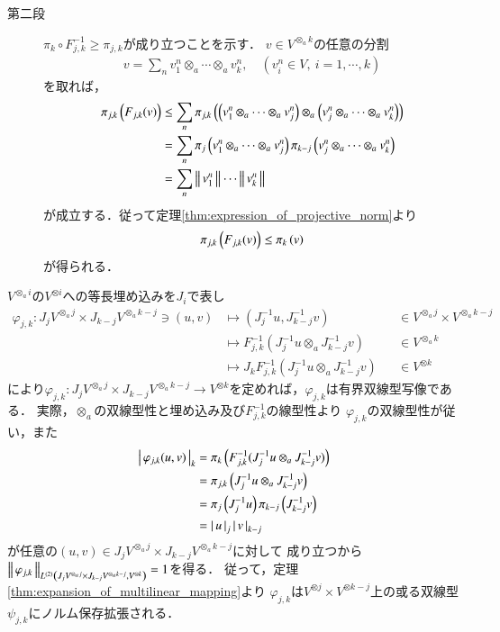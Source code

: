 \begin{prf}
\begin{description}
			\item[第二段]
				$\pi_k \circ F^{-1}_{j,k} \geq \pi_{j,k}$が成り立つことを示す．
				$v \in V^{\otimes_a k}$の任意の分割
				\begin{align}
					v = \sum_n v^n_1 \otimes_a \cdots \otimes_a v^n_k,
					\quad (v^n_i \in V,\ i=1,\cdots,k)
				\end{align}
				を取れば，
				\begin{align}
					\projectivenorm{F_{j,k}(v)}{j,k}
					&\leq \sum_n \projectivenorm{\left( v^n_1 \otimes_a \cdots \otimes_a v^n_j \right) \otimes_a \left( v^n_j \otimes_a \cdots \otimes_a v^n_k \right)}{j,k} \\
					&= \sum_n \projectivenorm{v^n_1 \otimes_a \cdots \otimes_a v^n_j}{j}
						\projectivenorm{v^n_j \otimes_a \cdots \otimes_a v^n_k}{k-j} \\
					&= \sum_n \Norm{v^n_1}{} \cdots \Norm{v^n_k}{}
				\end{align}
				が成立する．従って定理\ref{thm:expression_of_projective_norm}より
				\begin{align}
					\projectivenorm{F_{j,k}(v)}{j,k} \leq \projectivenorm{v}{k}
				\end{align}
				が得られる．
				\QED
		\end{description}
	\end{prf}
	
	
	$V^{\otimes_a i}$の$V^{\otimes i}$への等長埋め込みを$J_i$で表し
	\begin{align}
		\varphi_{j,k}:J_j V^{\otimes_a j} \times J_{k-j} V^{\otimes_a k-j} \ni (u,v)
		& \longmapsto ( J_j^{-1}u,J_{k-j}^{-1}v ) &&\in V^{\otimes_a j} \times V^{\otimes_a k-j} \\
		& \longmapsto F_{j,k}^{-1} (J_j^{-1}u \otimes_a J_{k-j}^{-1}v) &&\in V^{\otimes_a k} \\
		& \longmapsto J_k F_{j,k}^{-1} (J_j^{-1}u \otimes_a J_{k-j}^{-1}v) &&\in V^{\otimes k}
	\end{align}
	により$\varphi_{j,k}:J_j V^{\otimes_a j} \times J_{k-j} V^{\otimes_a k-j}
	\longrightarrow V^{\otimes k}$を定めれば，$\varphi_{j,k}$は有界双線型写像である．
	実際，$\otimes_a$の双線型性と埋め込み及び$F_{j,k}^{-1}$の線型性より
	$\varphi_{j,k}$の双線型性が従い，また
	\begin{align}
		\compcrossnorm{\varphi_{j,k}(u,v)}{k}
		&= \projectivenorm{F_{j,k}^{-1} (J_j^{-1}u \otimes_a J_{k-j}^{-1}v)}{k} \\
		&= \projectivenorm{J_j^{-1}u \otimes_a J_{k-j}^{-1}v}{j,k} \\
		&= \projectivenorm{J_j^{-1}u}{j} \projectivenorm{J_{k-j}^{-1}v}{k-j} \\
		&= \compcrossnorm{u}{j} \compcrossnorm{v}{k-j}
	\end{align}
	が任意の$(u,v) \in J_j V^{\otimes_a j} \times J_{k-j} V^{\otimes_a k-j}$に対して
	成り立つから$\Norm{\varphi_{j,k}}{\ContLn{J_j V^{\otimes_a j} \times J_{k-j} V^{\otimes_a k-j}}{V^{\otimes k}}{2}} = 1$を得る．
	従って，定理\ref{thm:expansion_of_multilinear_mapping}より
	$\varphi_{j,k}$は$V^{\otimes j} \times V^{\otimes k-j}$上の或る双線型
	$\psi_{j,k}$にノルム保存拡張される．
	
